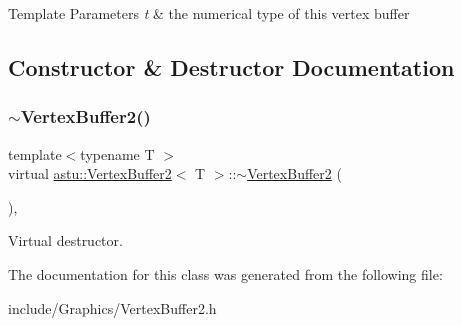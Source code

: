 \begin{DoxyTemplParams}{Template Parameters}
{\em t} & the numerical type of this vertex buffer \\
\hline
\end{DoxyTemplParams}


\subsection{Constructor \& Destructor Documentation}
\mbox{\label{classastu_1_1VertexBuffer2_a2b9e9497a9604c9e160047f8f8ae7d0d}} 
\subsubsection{\texorpdfstring{$\sim$\+Vertex\+Buffer2()}{~VertexBuffer2()}}
{\footnotesize\ttfamily template$<$typename T $>$ \\
virtual \hyperlink{classastu_1_1VertexBuffer2}{astu\+::\+Vertex\+Buffer2}$<$ T $>$\+::$\sim$\hyperlink{classastu_1_1VertexBuffer2}{Vertex\+Buffer2} (\begin{DoxyParamCaption}{ }\end{DoxyParamCaption})\hspace{0.3cm}{\ttfamily [inline]}, {\ttfamily [virtual]}}

Virtual destructor. 

The documentation for this class was generated from the following file\+:\begin{DoxyCompactItemize}
\item 
include/\+Graphics/Vertex\+Buffer2.\+h\end{DoxyCompactItemize}
